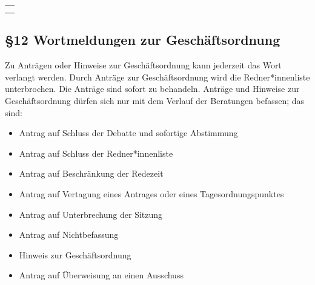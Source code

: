 \documentclass[12pt]{report}
\begin{document}
\begin{flushleft}
\begin{table}[H]
 \begin{tabular}{|l|}
  \hline
  \rowcolor[HTML]{9AFF99} 
  \rule[-1ex]{0pt}{4ex}
  \begin{minipage}[t]{\textwidth}
   \textbf{Ende\\}  
    \end{minipage}
  \\ \hline
 \end{tabular}
\end{table}

\subsection*{§12 Wortmeldungen zur Geschäftsordnung}
Zu Anträgen oder Hinweise zur Geschäftsordnung kann jederzeit das Wort verlangt werden. Durch Anträge
zur Geschäftsordnung wird die {\color{red}Redner*innenliste} unterbrochen. Die Anträge sind sofort zu behandeln. Anträge und
Hinweise zur Geschäftsordnung dürfen sich nur mit dem Verlauf der Beratungen befassen; das sind:

\begin{itemize}
  \item Antrag auf Schluss der Debatte und sofortige Abstimmung
  \item Antrag auf Schluss der {\color{red}Redner*innenliste}
  \item Antrag auf Beschränkung der Redezeit
  \item Antrag auf Vertagung eines Antrages oder eines Tagesordnungspunktes
  \item Antrag auf Unterbrechung der Sitzung
  \item Antrag auf Nichtbefassung
  \item Hinweis zur Geschäftsordnung
  \item Antrag auf Überweisung an einen Ausschuss
\end{itemize}


\end{flushleft}
\end{document}
